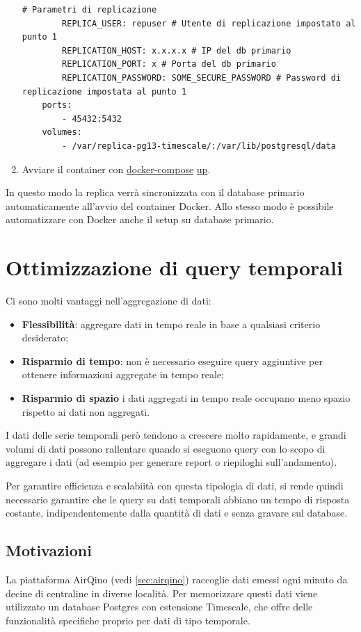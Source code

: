 \begin{enumerate}
\begin{lstlisting}[]
        # Parametri di replicazione
        REPLICA_USER: repuser # Utente di replicazione impostato al punto 1
        REPLICATION_HOST: x.x.x.x # IP del db primario
        REPLICATION_PORT: x # Porta del db primario
        REPLICATION_PASSWORD: SOME_SECURE_PASSWORD # Password di replicazione impostata al punto 1
    ports:
        - 45432:5432
    volumes:
        - /var/replica-pg13-timescale/:/var/lib/postgresql/data
\end{lstlisting}

  \item Avviare il container con \url{docker-compose} \url{up}.
\end{enumerate}

In questo modo la replica verrà sincronizzata con il database primario automaticamente all'avvio del container Docker.
Allo stesso modo è possibile automatizzare con Docker anche il setup su database primario.

\section{Ottimizzazione di query temporali}\label{sec:cont-aggr}
Ci sono molti vantaggi nell'aggregazione di dati:
\begin{itemize}
  \item \textbf{Flessibilità}: aggregare dati in tempo reale in base a qualsiasi criterio desiderato;
  \item \textbf{Risparmio di tempo}: non è necessario eseguire query aggiuntive per ottenere informazioni aggregate in tempo reale;
  \item \textbf{Risparmio di spazio} i dati aggregati in tempo reale occupano meno spazio rispetto ai dati non aggregati.
\end{itemize}

I dati delle serie temporali però tendono a crescere molto rapidamente, e grandi volumi di dati possono rallentare quando si eseguono query con lo scopo di aggregare i dati (ad esempio per generare report o riepiloghi sull'andamento).

Per garantire efficienza e scalabiità con questa tipologia di dati, si rende quindi necessario garantire che le query su dati temporali abbiano un tempo di risposta costante, indipendentemente dalla quantità di dati e senza gravare sul database.

\subsection{Motivazioni}\label{ssec:cont-aggr-motivazioni}
La piattaforma AirQino (vedi \ref{sec:airqino}) raccoglie dati emessi ogni minuto da decine di centraline in diverse località. Per memorizzare questi dati viene utilizzato un database Postgres con estensione Timescale, che offre delle funzionalità specifiche proprio per dati di tipo temporale.

